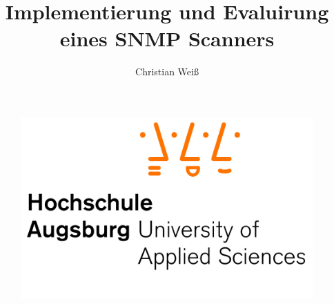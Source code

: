 \documentclass[11pt,a4paper]{article}
\author{Christian Weiß}
\title{Implementierung und Evaluirung eines SNMP Scanners}
\begin{document}
\renewcommand{\arraystretch}{1.2}

\newcommand{\emptyline}{\ \\}

\begin{figure}	%
	\centering
	\includegraphics[scale=.7]{Bilder/hsa.jpg}
	\label{img:logo}
\end{figure}
	
\vspace{\fill}
\end{document}
